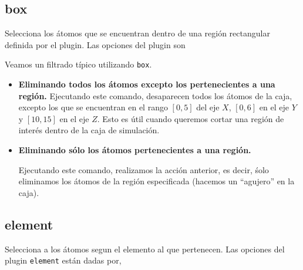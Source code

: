 \subsection{box}
Selecciona los \'atomos que se encuentran dentro de una regi\'on rectangular definida por el plugin. Las opciones del plugin son


Veamos un filtrado t\'ipico utilizando \verb|box|.

\begin{itemize}
 \item \textbf{Eliminando todos los \'atomos excepto los pertenecientes a una regi\'on.}
Ejecutando este comando, desaparecen todos los \'atomos de la caja, excepto los que se encuentran en el rango $[0,5]$ del eje $X$, $[0,6]$ en el eje $Y$ y $[10,15]$ en el eje $Z$. Esto es \'util cuando queremos cortar una regi\'on de inter\'es dentro de la caja de simulaci\'on.

 
 \item \textbf{Eliminando s\'olo los \'atomos pertenecientes a una regi\'on.}

Ejecutando este comando, realizamos la acci\'on anterior, es decir, \'solo eliminamos los \'atomos de la regi\'on especificada (hacemos un ``agujero'' en la caja).
\end{itemize}







\subsection{element}
Selecciona a los \'atomos segun el elemento al que pertenecen. Las opciones del plugin \verb|element| est\'an dadas por,



